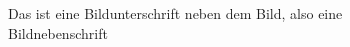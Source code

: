 \documentclass{article}
\begin{document}
\begin{figure}
    \caption{Das ist eine Bildunterschrift neben dem Bild, also eine 
Bildnebenschrift}
    \label{abbildung01001}
\end{figure}
\end{document}
